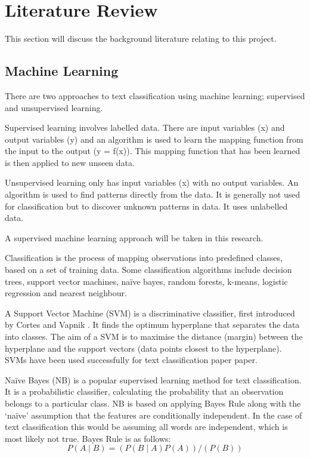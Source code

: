 \chapter{Literature Review}
This section will discuss the background literature relating to this project.

\section{Machine Learning}
There are two approaches to text classification using machine learning; supervised and unsupervised learning.

Supervised learning involves labelled data. There are input variables (x) and output variables (y) and an algorithm is used to learn the mapping function from the input to the output (y = f(x)). This mapping function that has been learned is then applied to new unseen data.

Unsupervised learning only has input variables (x) with no output variables. An algorithm is used to find patterns directly from the data. It is generally not used for classification but to discover unknown patterns in data. It uses unlabelled data.

A supervised machine learning approach will be taken in this research.

Classification is the process of mapping observations into predefined classes, based on a set of training data. Some classification algorithms include decision trees, support vector machines, naïve bayes, random forests, k-means, logistic regression and nearest neighbour.

A Support Vector Machine (SVM) is a discriminative classifier, first introduced by Cortes and Vapnik \cite{Vapnik1995,Vapnik21995}. It finds the optimum hyperplane that separates the data into classes. The aim of a SVM is to maximise the distance (margin) between the hyperplane and the support vectors (data points closest to the hyperplane). SVMs have been used successfully for text classification paper paper.

Naïve Bayes (NB) is a popular supervised learning method for text classification. It is a probabilistic classifier, calculating the probability that an observation belongs to a particular class. NB is based on applying Bayes Rule along with the ‘naïve’ assumption that the features are conditionally independent. In the case of text classification this would be assuming all words are independent, which is most likely not true. 
Bayes Rule is as follows:  \[P(A\mid B)=(P(B \mid A)P(A))/(P(B))\]

